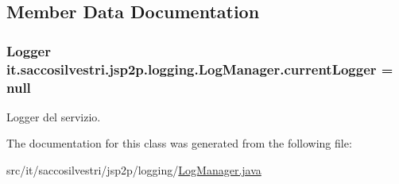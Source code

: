 \subsection{\-Member \-Data \-Documentation}
\hypertarget{classit_1_1saccosilvestri_1_1jsp2p_1_1logging_1_1_log_manager_ac534c0785d97731f02293b165c9e0bd7}{
\subsubsection[{current\-Logger}]{\setlength{\rightskip}{0pt plus 5cm}\-Logger {\bf it.\-saccosilvestri.\-jsp2p.\-logging.\-Log\-Manager.\-current\-Logger} = null}}
\label{classit_1_1saccosilvestri_1_1jsp2p_1_1logging_1_1_log_manager_ac534c0785d97731f02293b165c9e0bd7}


\-Logger del servizio. 



\-The documentation for this class was generated from the following file\-:\begin{DoxyCompactItemize}
\item 
src/it/saccosilvestri/jsp2p/logging/\hyperlink{_log_manager_8java}{\-Log\-Manager.\-java}\end{DoxyCompactItemize}
